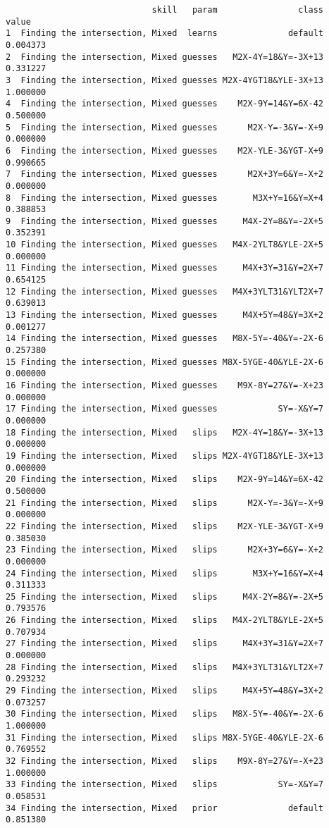 \documentclass{article}
\begin{document}
\begin{verbatim}
                             skill   param                class    value
1  Finding the intersection, Mixed  learns              default 0.004373
2  Finding the intersection, Mixed guesses   M2X-4Y=18&Y=-3X+13 0.331227
3  Finding the intersection, Mixed guesses M2X-4YGT18&YLE-3X+13 1.000000
4  Finding the intersection, Mixed guesses    M2X-9Y=14&Y=6X-42 0.500000
5  Finding the intersection, Mixed guesses      M2X-Y=-3&Y=-X+9 0.000000
6  Finding the intersection, Mixed guesses    M2X-YLE-3&YGT-X+9 0.990665
7  Finding the intersection, Mixed guesses      M2X+3Y=6&Y=-X+2 0.000000
8  Finding the intersection, Mixed guesses       M3X+Y=16&Y=X+4 0.388853
9  Finding the intersection, Mixed guesses     M4X-2Y=8&Y=-2X+5 0.352391
10 Finding the intersection, Mixed guesses   M4X-2YLT8&YLE-2X+5 0.000000
11 Finding the intersection, Mixed guesses     M4X+3Y=31&Y=2X+7 0.654125
12 Finding the intersection, Mixed guesses   M4X+3YLT31&YLT2X+7 0.639013
13 Finding the intersection, Mixed guesses     M4X+5Y=48&Y=3X+2 0.001277
14 Finding the intersection, Mixed guesses   M8X-5Y=-40&Y=-2X-6 0.257380
15 Finding the intersection, Mixed guesses M8X-5YGE-40&YLE-2X-6 0.000000
16 Finding the intersection, Mixed guesses    M9X-8Y=27&Y=-X+23 0.000000
17 Finding the intersection, Mixed guesses            SY=-X&Y=7 0.000000
18 Finding the intersection, Mixed   slips   M2X-4Y=18&Y=-3X+13 0.000000
19 Finding the intersection, Mixed   slips M2X-4YGT18&YLE-3X+13 0.000000
20 Finding the intersection, Mixed   slips    M2X-9Y=14&Y=6X-42 0.500000
21 Finding the intersection, Mixed   slips      M2X-Y=-3&Y=-X+9 0.000000
22 Finding the intersection, Mixed   slips    M2X-YLE-3&YGT-X+9 0.385030
23 Finding the intersection, Mixed   slips      M2X+3Y=6&Y=-X+2 0.000000
24 Finding the intersection, Mixed   slips       M3X+Y=16&Y=X+4 0.311333
25 Finding the intersection, Mixed   slips     M4X-2Y=8&Y=-2X+5 0.793576
26 Finding the intersection, Mixed   slips   M4X-2YLT8&YLE-2X+5 0.707934
27 Finding the intersection, Mixed   slips     M4X+3Y=31&Y=2X+7 0.000000
28 Finding the intersection, Mixed   slips   M4X+3YLT31&YLT2X+7 0.293232
29 Finding the intersection, Mixed   slips     M4X+5Y=48&Y=3X+2 0.073257
30 Finding the intersection, Mixed   slips   M8X-5Y=-40&Y=-2X-6 1.000000
31 Finding the intersection, Mixed   slips M8X-5YGE-40&YLE-2X-6 0.769552
32 Finding the intersection, Mixed   slips    M9X-8Y=27&Y=-X+23 1.000000
33 Finding the intersection, Mixed   slips            SY=-X&Y=7 0.058531
34 Finding the intersection, Mixed   prior              default 0.851380
\end{verbatim}
    
\end{document}
